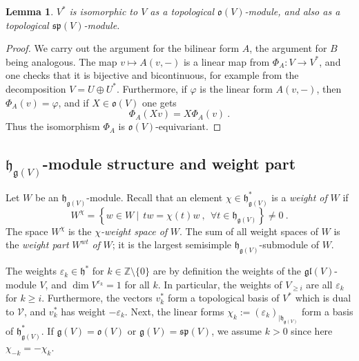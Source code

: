 \documentclass[12pt,reqno]{amsart}
\newtheorem{lem}[thm]{Lemma}
\theoremstyle{definition}
\theoremstyle{remark}
\begin{document}
    \begin{lem}\label{lem:vvast}
       $V^\ast$ is isomorphic to $V$ as a topological 
       $\mathfrak{o}(V)$-module, and also as a topological
            $\mathfrak{sp}(V)$-module.     
    \end{lem}
    \begin{proof}
We carry out the argument for the bilinear form $A$, the argument for $B$ being analogous. The map $v\mapsto A(v,-)$ is a linear map from $\Phi_A : V\rightarrow V^\ast$, and one checks that it is bijective and bicontinuous, for example from the decomposition 
$V=U\oplus U^\ast$. Furthermore,
if $\varphi$ is the linear form $A(v,-)$, then $\Phi_A (v) = \varphi$, and if 
$X\in \mathfrak{o}(V)$ one gets 
\[
\Phi_A (Xv) = X\Phi_A(v) \ .
\]
Thus the isomorphism $\Phi_A$ is $\mathfrak{o}(V)$-equivariant.
    \end{proof}
	
	\subsection{$\mathfrak{h}_{\mathfrak{g}(V)}$-module structure and weight part}
	Let $W$ be an $\mathfrak{h}_{\mathfrak{g}(V)}$-module. Recall that an element $\chi\in \mathfrak{h}_{\mathfrak{g}(V)}^\ast$ is a \emph{weight of} $W$ if
	$$
	W^\chi = \left\{ w\in W \ | \ \ tw = \chi(t)w \ ,  \ \ 
 \forall t\in\mathfrak{h}_{\mathfrak{g}(V)}\right\} \neq 0 \ .
	$$
	The space $W^\chi$ is the \emph{$\chi$-weight space of} $W$.
	The sum of all weight spaces of $W$ is the \textit{weight part} $W^{wt}$ \emph{of} $W$; it is the largest semisimple $\mathfrak{h}_{\mathfrak{g}(V)}$-submodule of $W$.

 The weights $\varepsilon_k\in \mathfrak{h}^\ast$ for $k\in \mathbb{Z} \setminus \{0\}$ are by definition the weights of the $\mathfrak{gl}(V)$-module $V$, and $\dim V^{\varepsilon_k} = 1$ for all $k$. In particular, the weights of $V_{\geq i}$ are all $\varepsilon_k$ for $k\geq i$. Furthermore, the vectors $v_k ^\ast$ form a topological basis of $V^\ast$ which is dual to $\mathcal{V}$, and $v_k ^\ast$ has weight $-\varepsilon_k$.  Next, the linear forms $\chi_k := (\varepsilon_k)_{|\mathfrak{h}_{\mathfrak{g}(V)}}$ form a basis of $\mathfrak{h}_{\mathfrak{g}(V)}^\ast$. If $\mathfrak{g}(V) = \mathfrak{o}(V)$ or $\mathfrak{g}(V) = \mathfrak{sp}(V)$, we assume $k>0$ since here $\chi_{-k} = -\chi_k$.
	
	
\end{document}

